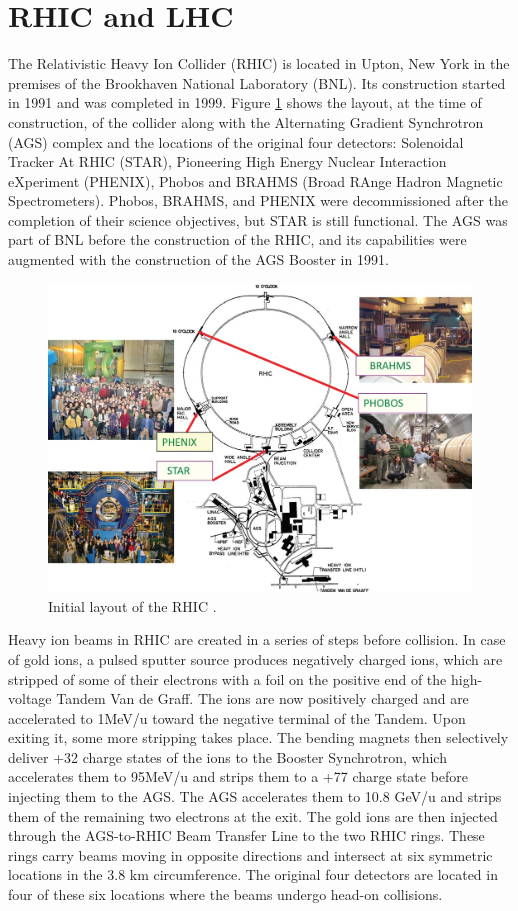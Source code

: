 \section{RHIC and LHC}
The Relativistic Heavy Ion Collider (RHIC) is located in Upton, New York in the premises of the Brookhaven National Laboratory (BNL). Its construction started in 1991 and was completed in 1999. Figure \ref{fig:RHIC_layout} shows the layout, at the time of construction, of the collider along with the Alternating Gradient Synchrotron (AGS) complex and the locations of the original four detectors: Solenoidal Tracker At RHIC (STAR), Pioneering High Energy Nuclear Interaction eXperiment (PHENIX), Phobos and BRAHMS (Broad RAnge Hadron Magnetic Spectrometers). Phobos, BRAHMS, and PHENIX were decommissioned after the completion of their science objectives, but STAR is still functional. The AGS was part of BNL before the construction of the RHIC, and its capabilities were augmented with the construction of the AGS Booster in 1991.
\begin{figure}[h]
  \centering
  \includegraphics[width=6.5in]{figures/RHIC_Layout.jpeg}
  \caption{Initial layout of the RHIC \cite{doi:10.1093/ptep/ptu093}.}\label{fig:RHIC_layout}
\end{figure}

Heavy ion beams in RHIC are created in a series of steps before collision. In case of gold ions, a pulsed sputter source produces negatively charged ions, which are stripped of some of their electrons with a foil on the positive end of the high-voltage Tandem Van de Graff. The ions are now positively charged and are accelerated to 1MeV/u toward the negative terminal of the Tandem. Upon exiting it, some more stripping takes place. The bending magnets then selectively deliver +32 charge states of the ions to the Booster Synchrotron, which accelerates them to 95MeV/u and strips them to a +77 charge state before injecting them to the AGS. The AGS accelerates them to 10.8 GeV/u and strips them of the remaining two electrons at the exit. The gold ions are then injected through the AGS-to-RHIC Beam Transfer Line to the two RHIC rings. These rings carry beams moving in opposite directions and intersect at six symmetric locations in the 3.8 km circumference. The original four detectors are located in four of these six locations where the beams undergo head-on collisions.

